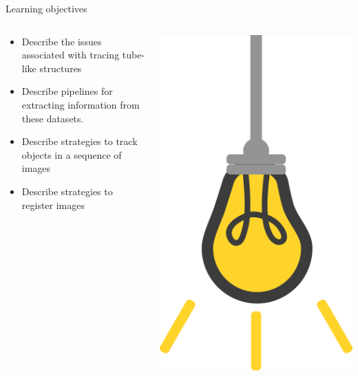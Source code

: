 \documentclass[9pt, aspectratio=169]{beamer}
\begin{document}
\begin{frame}
    {Learning objectives}
    \begin{columns}
        \begin{column}{0.8\textwidth}
            \begin{itemize}
                \item Describe the issues associated with tracing tube-like structures
                \item Describe pipelines for extracting information from these datasets.
                \item Describe strategies to track objects in a sequence of images
                \item Describe strategies to register images
            \end{itemize}
        \end{column}
        \begin{column}{0.2\textwidth}
            \includegraphics[angle=-30, origin=tr, width=1.5\textwidth]{lightbulb.png}
        \end{column}
    \end{columns}
\end{frame}
\end{document}
